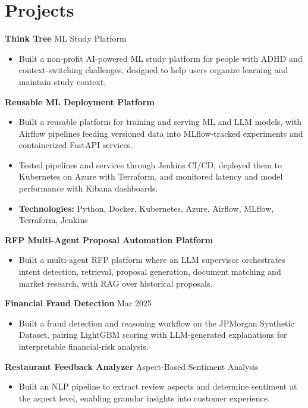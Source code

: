 \documentclass[10pt,a4paper]{article}
\begin{document}
\section{Projects}
\textbf{Think Tree} \textbar{} ML Study Platform\par
\begin{itemize}
  \item Built a non-profit AI-powered ML study platform for people with ADHD and context-switching challenges, designed to help users organize learning and maintain study context.
\end{itemize}
\textbf{Reusable ML Deployment Platform}\par
\begin{itemize}
  \item Built a reusable platform for training and serving ML and LLM models, with Airflow pipelines feeding versioned data into MLflow-tracked experiments and containerized FastAPI services.
  \item Tested pipelines and services through Jenkins CI/CD, deployed them to Kubernetes on Azure with Terraform, and monitored latency and model performance with Kibana dashboards.
  \item \textbf{Technologies:} Python, Docker, Kubernetes, Azure, Airflow, MLflow, Terraform, Jenkins
\end{itemize}
\textbf{RFP Multi-Agent Proposal Automation Platform}\par
\begin{itemize}
  \item Built a multi-agent RFP platform where an LLM supervisor orchestrates intent detection, retrieval, proposal generation, document matching and market research, with RAG over historical proposals.
\end{itemize}
\textbf{Financial Fraud Detection} \textbar{} Mar 2025\par
\begin{itemize}
  \item Built a fraud detection and reasoning workflow on the JPMorgan Synthetic Dataset, pairing LightGBM scoring with LLM-generated explanations for interpretable financial-risk analysis.
\end{itemize}
\textbf{Restaurant Feedback Analyzer} \textbar{} Aspect-Based Sentiment Analysis\par
\begin{itemize}
  \item Built an NLP pipeline to extract review aspects and determine sentiment at the aspect level, enabling granular insights into customer experience.
\end{itemize}
\end{document}
